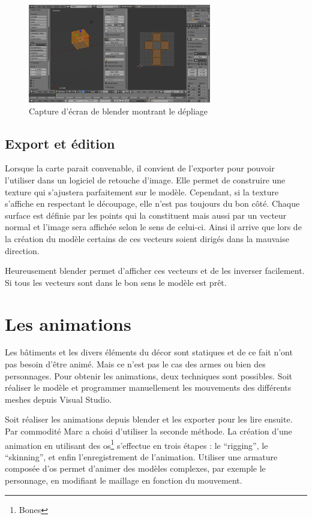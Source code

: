 \documentclass[11pt]{report}
\begin{document}
\begin{figure}[htbp]
\centering
\includegraphics[width=8cm]{unwrap.png}
\caption{Capture d'écran de blender montrant le dépliage}
\end{figure}

\subsection{Export et édition}

Lorsque la carte parait convenable, il convient de l’exporter pour pouvoir l’utiliser dans un logiciel de retouche d’image. Elle permet de construire une texture qui s’ajustera parfaitement sur le modèle.  Cependant, si la texture s’affiche en respectant le découpage, elle n’est pas toujours du bon côté. Chaque surface est définie par les points qui la constituent mais aussi par un vecteur normal et l’image sera affichée selon le sens de celui-ci. Ainsi il arrive que lors de la création du modèle certains de ces vecteurs soient dirigés dans la mauvaise direction.

Heureusement blender permet d’afficher ces vecteurs et de les inverser facilement. Si tous les vecteurs sont dans le bon sens le modèle est prêt.

\section{Les animations}

Les bâtiments et les divers éléments du décor sont statiques et de ce fait n’ont pas besoin d’être animé. Mais ce n’est pas le cas des armes ou bien des personnages. Pour obtenir les animations, deux techniques sont possibles. Soit réaliser le modèle et programmer manuellement les mouvements des différents meshes depuis Visual Studio.

Soit réaliser les animations depuis blender et les exporter pour les lire ensuite. Par commodité Marc a choisi d’utiliser la seconde méthode. La création d’une animation en utilisant des os\footnote{Bones} s’effectue en trois étapes : le ``rigging'', le ``skinning'', et enfin l’enregistrement de l’animation. Utiliser une armature composée d'os permet d'animer des modèles complexes, par exemple le personnage, en modifiant le maillage en fonction du mouvement.
\end{document}
